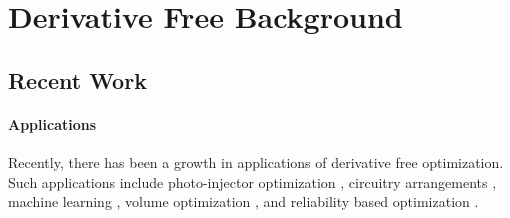 \section{Derivative Free Background}
% 
% 
% 

\subsection{Recent Work}
\paragraph{Applications}
Recently, there has been a growth in applications of derivative free optimization.
Such applications include photo-injector optimization \cite{1742-6596-874-1-012062}, circuitry arrangements \cite{PLOSKAS201816}, machine learning \cite{KS2018}, volume optimization \cite{Cheng2017}, and reliability based optimization \cite{Gao2017}.

